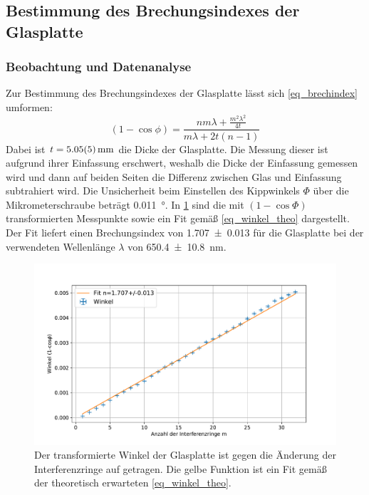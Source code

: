 \documentclass[
	a4paper,
	12pt,
	pagesize,
	ngerman
]{scrartcl}
\begin{document}
	\subsection{Bestimmung des Brechungsindexes der Glasplatte}
	\subsubsection{Beobachtung und Datenanalyse}
	Zur Bestimmung des Brechungsindexes der Glasplatte lässt sich \cref{eq_brechindex} umformen:
	\begin{equation}
		(1-\cos{\phi}) = \frac{nm\lambda+\frac{m^2\lambda^2}{4t}}{m\lambda+2t(n-1)}
		\label{eq_winkel_theo}
	\end{equation}
	Dabei ist $t= \SI{5.05+-0.05}{mm}$ die Dicke der Glasplatte.
	Die Messung dieser ist aufgrund ihrer Einfassung erschwert, weshalb die Dicke der Einfassung gemessen wird und dann auf beiden Seiten die Differenz zwischen Glas und Einfassung subtrahiert wird.
	Die Unsicherheit beim Einstellen des Kippwinkels $\Phi$ über die Mikrometerschraube beträgt \SI{0.011}{\degree}.
	In \cref{fig_glas} sind die mit $(1-\cos{\Phi})$ transformierten Messpunkte sowie ein Fit gemäß \cref{eq_winkel_theo} dargestellt.
	Der Fit liefert einen Brechungsindex von \SI{1.707+-0.013}{} für die Glasplatte bei der verwendeten Wellenlänge $\lambda$ von \SI{650.4+-10.8}{nm}.

\begin{figure}[H]
		\includegraphics[width=\textwidth]{images/Glas.pdf}
		\centering
		\caption{Der transformierte Winkel der Glasplatte ist gegen die Änderung der Interferenzringe auf getragen.
		Die gelbe Funktion ist ein Fit gemäß der theoretisch erwarteten \cref{eq_winkel_theo}.}
		\label{fig_glas}
	\end{figure}
\end{document}
